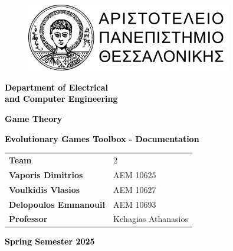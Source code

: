 \documentclass[12pt]{article}
\begin{document}
\begin{titlepage}
\centering
\begin{figure}[H]
\centering
\includegraphics[width=0.8\textwidth]{banner-horizontal-black300ppi.png}\par %
\end{figure}
\vspace{18pt}
\textcolor{black}{\Large \bfseries Department of Electrical\\and Computer Engineering\\}\par
\vspace{1cm}
\vfill
\textcolor{black}{\Large \bfseries Game Theory}\par
\vspace{12pt}
\textcolor{black}{\large \bfseries Evolutionary Games Toolbox - Documentation}\par

\vspace{0.5cm} %
\vfill
{}%
%
{\large
\def\arraystretch{1.3}
\begin{tabularx}{\textwidth}{ R|L }
\textbf{Team}                			 & 2           \\
\textbf{Vaporis Dimitrios}      & ΑΕΜ 10625 \\
\textbf{Voulkidis Vlasios}        & ΑΕΜ 10627 \\
\textbf{Delopoulos Emmanouil}      & ΑΕΜ 10693 \\
\textbf{Professor}           & Kehagias Athanasios\\
\end{tabularx}
}
\vspace{0.5cm}
\vfill
\textcolor{black}{\large \bfseries Spring Semester 2025}\par
\end{titlepage}
\restoregeometry
\end{document}
